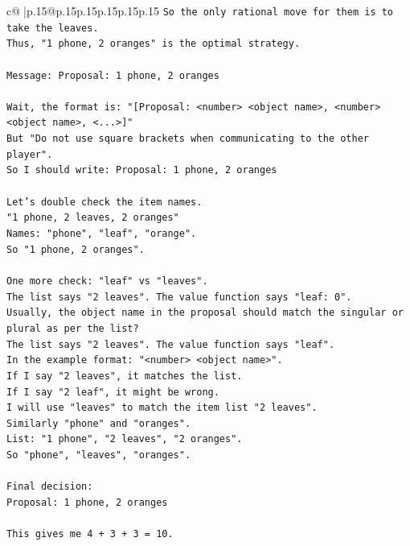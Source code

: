 \documentclass{article}
\begin{document}
{\begin{supertabular}{c@{$\;$}|p{.15\linewidth}@{}p{.15\linewidth}p{.15\linewidth}p{.15\linewidth}p{.15\linewidth}p{.15\linewidth}}
{{{\texttt{So the only rational move for them is to take the leaves.} \\
\texttt{Thus, "1 phone, 2 oranges" is the optimal strategy.} \\
\\ 
\texttt{Message: Proposal: 1 phone, 2 oranges} \\
\\ 
\texttt{Wait, the format is: "{[}Proposal: <number> <object name>, <number> <object name>, <...>{]}"} \\
\texttt{But "Do not use square brackets when communicating to the other player".} \\
\texttt{So I should write: Proposal: 1 phone, 2 oranges} \\
\\ 
\texttt{Let's double check the item names.} \\
\texttt{"1 phone, 2 leaves, 2 oranges"} \\
\texttt{Names: "phone", "leaf", "orange".} \\
\texttt{So "1 phone, 2 oranges".} \\
\\ 
\texttt{One more check: "leaf" vs "leaves".} \\
\texttt{The list says "2 leaves". The value function says "leaf: 0".} \\
\texttt{Usually, the object name in the proposal should match the singular or plural as per the list?} \\
\texttt{The list says "2 leaves". The value function says "leaf".} \\
\texttt{In the example format: "<number> <object name>".} \\
\texttt{If I say "2 leaves", it matches the list.} \\
\texttt{If I say "2 leaf", it might be wrong.} \\
\texttt{I will use "leaves" to match the item list "2 leaves".} \\
\texttt{Similarly "phone" and "oranges".} \\
\texttt{List: "1 phone", "2 leaves", "2 oranges".} \\
\texttt{So "phone", "leaves", "oranges".} \\
\\ 
\texttt{Final decision:} \\
\texttt{Proposal: 1 phone, 2 oranges} \\
\\ 
\texttt{This gives me 4 + 3 + 3 = 10.} \\
}}}
\end{supertabular}}
\end{document}
